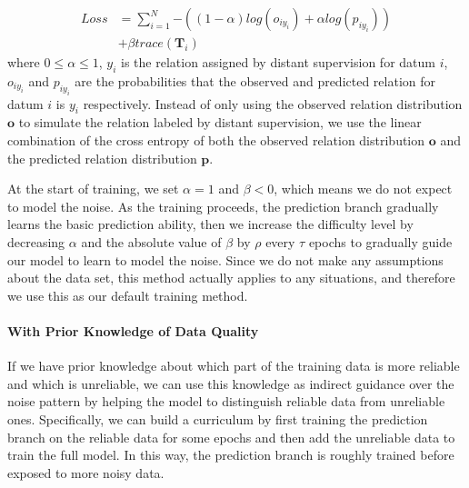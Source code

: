 
\begin{equation}
\begin{aligned}
Loss	&=\sum_{i=1}^N{-((1-\alpha) log(o_{iy_{i}}) + \alpha log(p_{iy_{i}}))} \\
&+ \beta trace(\mathbf{T}_{i})
\end{aligned}
\label{general_loss}
\end{equation}
where $0\le\alpha\le1$, $y_i$ is the relation assigned by distant supervision for datum $i$, $o_{iy_{i}}$ and $p_{iy_{i}}$ are the probabilities that the observed and predicted relation for datum $i$ is $y_i$ respectively. Instead of only using the observed relation distribution $\mathbf{o}$ to simulate the relation labeled by distant supervision, we use the linear combination of the cross entropy of both the observed relation distribution $\mathbf{o}$ and the predicted relation distribution $\mathbf{p}$.

At the start of training, we set $\alpha=1$ and $\beta<0$, which means we do not expect to model the noise. As the training proceeds, the prediction branch gradually learns the basic prediction ability, then we increase the difficulty level by decreasing $\alpha$ and the absolute value of $\beta$ by $\rho$ every $\tau$ epochs to gradually guide our model to learn to model the noise. Since we do not make any assumptions about the data set, this method actually applies to any situations, and therefore we use this as our default training method.

\paragraph{With Prior Knowledge of Data Quality}
If we have prior knowledge about which part of the training data is more reliable and which is unreliable, we can use this knowledge as indirect guidance over the noise pattern by helping the model to distinguish reliable data from unreliable ones. Specifically, we can build a curriculum by first training the prediction branch on the reliable data for some epochs and then add the unreliable data to train the full model. In this way, the prediction branch is roughly trained before exposed to more noisy data.

